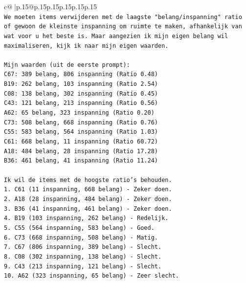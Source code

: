\documentclass{article}
\begin{document}
{\begin{supertabular}{c@{$\;$}|p{.15\linewidth}@{}p{.15\linewidth}p{.15\linewidth}p{.15\linewidth}p{.15\linewidth}p{.15\linewidth}}
{{{\\ 
\texttt{We moeten items verwijderen met de laagste "belang/inspanning" ratio of gewoon de kleinste inspanning om ruimte te maken, afhankelijk van wat voor u het beste is. Maar aangezien ik mijn eigen belang wil maximaliseren, kijk ik naar mijn eigen waarden.} \\
\\ 
\texttt{Mijn waarden (uit de eerste prompt):} \\
\texttt{C67: 389 belang, 806 inspanning (Ratio 0.48)} \\
\texttt{B19: 262 belang, 103 inspanning (Ratio 2.54)} \\
\texttt{C08: 138 belang, 302 inspanning (Ratio 0.45)} \\
\texttt{C43: 121 belang, 213 inspanning (Ratio 0.56)} \\
\texttt{A62: 65 belang, 323 inspanning (Ratio 0.20)} \\
\texttt{C73: 508 belang, 668 inspanning (Ratio 0.76)} \\
\texttt{C55: 583 belang, 564 inspanning (Ratio 1.03)} \\
\texttt{C61: 668 belang, 11 inspanning (Ratio 60.72)} \\
\texttt{A18: 484 belang, 28 inspanning (Ratio 17.28)} \\
\texttt{B36: 461 belang, 41 inspanning (Ratio 11.24)} \\
\\ 
\texttt{Ik wil de items met de hoogste ratio's behouden.} \\
\texttt{1. C61 (11 inspanning, 668 belang) {-} Zeker doen.} \\
\texttt{2. A18 (28 inspanning, 484 belang) {-} Zeker doen.} \\
\texttt{3. B36 (41 inspanning, 461 belang) {-} Zeker doen.} \\
\texttt{4. B19 (103 inspanning, 262 belang) {-} Redelijk.} \\
\texttt{5. C55 (564 inspanning, 583 belang) {-} Goed.} \\
\texttt{6. C73 (668 inspanning, 508 belang) {-} Matig.} \\
\texttt{7. C67 (806 inspanning, 389 belang) {-} Slecht.} \\
\texttt{8. C08 (302 inspanning, 138 belang) {-} Slecht.} \\
\texttt{9. C43 (213 inspanning, 121 belang) {-} Slecht.} \\
\texttt{10. A62 (323 inspanning, 65 belang) {-} Zeer slecht.} \\
}}}
\end{supertabular}}
\end{document}
